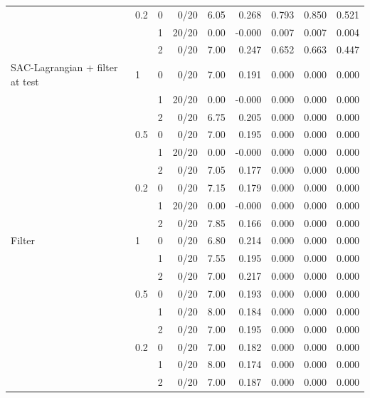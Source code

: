 {\begin{tabular}{llrrrrrrr}
 & 0.2 & 0 & 0/20 & 6.05 & 0.268 & 0.793 & 0.850 & 0.521 \\
 &  & 1 & 20/20 & 0.00 & -0.000 & 0.007 & 0.007 & 0.004 \\
 &  & 2 & 0/20 & 7.00 & 0.247 & 0.652 & 0.663 & 0.447 \\
\addlinespace
SAC-Lagrangian + filter at test & 1 & 0 & 0/20 & 7.00 & 0.191 & 0.000 & 0.000 & 0.000 \\
 &  & 1 & 20/20 & 0.00 & -0.000 & 0.000 & 0.000 & 0.000 \\
 &  & 2 & 0/20 & 6.75 & 0.205 & 0.000 & 0.000 & 0.000 \\
 & 0.5 & 0 & 0/20 & 7.00 & 0.195 & 0.000 & 0.000 & 0.000 \\
 &  & 1 & 20/20 & 0.00 & -0.000 & 0.000 & 0.000 & 0.000 \\
 &  & 2 & 0/20 & 7.05 & 0.177 & 0.000 & 0.000 & 0.000 \\
 & 0.2 & 0 & 0/20 & 7.15 & 0.179 & 0.000 & 0.000 & 0.000 \\
 &  & 1 & 20/20 & 0.00 & -0.000 & 0.000 & 0.000 & 0.000 \\
 &  & 2 & 0/20 & 7.85 & 0.166 & 0.000 & 0.000 & 0.000 \\
\addlinespace
Filter & 1 & 0 & 0/20 & 6.80 & 0.214 & 0.000 & 0.000 & 0.000 \\
 &  & 1 & 0/20 & 7.55 & 0.195 & 0.000 & 0.000 & 0.000 \\
 &  & 2 & 0/20 & 7.00 & 0.217 & 0.000 & 0.000 & 0.000 \\
 & 0.5 & 0 & 0/20 & 7.00 & 0.193 & 0.000 & 0.000 & 0.000 \\
 &  & 1 & 0/20 & 8.00 & 0.184 & 0.000 & 0.000 & 0.000 \\
 &  & 2 & 0/20 & 7.00 & 0.195 & 0.000 & 0.000 & 0.000 \\
 & 0.2 & 0 & 0/20 & 7.00 & 0.182 & 0.000 & 0.000 & 0.000 \\
 &  & 1 & 0/20 & 8.00 & 0.174 & 0.000 & 0.000 & 0.000 \\
 &  & 2 & 0/20 & 7.00 & 0.187 & 0.000 & 0.000 & 0.000 \\
\bottomrule\end{tabular}}
